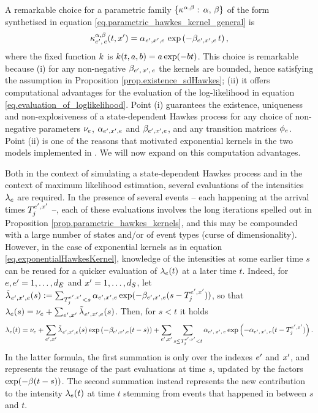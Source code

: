 \documentclass[10pt, article,table]{article}
\begin{document}
A remarkable choice for a parametric family $\lbrace \hawkesKernel^{\impCoef,\decCoef}: \, \impCoef, \, \decCoef\rbrace$ of the form synthetised in equation \eqref{eq.parametric_hawkes_kernel_general} is 
\begin{equation}\label{eq.exponentialHawkesKernel}
 \hawkesKernel^{\alpha,\beta}\subscriptee(t,\xone) = \impCoef_{\eone,\xone,e} \, \exp\left( -\decCoef_{\eone,\xone,e} \, t \right),
\end{equation}
where the fixed function $\parametricHawkesKernel$ is $\parametricHawkesKernel(t,a,b)=a\exp(-bt)$.
This choice is remarkable because (i) for any non-negative $\decCoef\subscriptexe$ the kernels are bounded, hence satisfying the assumption in Proposition \ref{prop.existence_sdHawkes}; (ii) it offers computational advantages for the evaluation of the log-likelihood in equation \eqref{eq.evaluation_of_loglikelihood}. 
Point (i) guarantees the existence, uniqueness and non-explosiveness of a state-dependent Hawkes process for any choice of non-negative parameters $\baseRate_e$, 
$\impCoef_{\eone,\xone, e}$ and $\decCoef_{\eone,\xone, e}$, and any transition matrices $\transProb_e$. Point (ii) is one of the reasons that motivated  exponential kernels in the two models implemented in \citealp{MP18sta}. We will now expand on this computation advantages. 

Both in the context of simulating a state-dependent Hawkes process and in the context of maximum likelihood estimation, several evaluations of the intensities $\intensity$ are required. 
In the presence of several events -- each happening at the arrival times $\arrivalTimes[\eone,\xone]_j$ --, each of these evaluations involves the long iterations spelled out in Proposition \ref{prop.parametric_hawkes_kernels}, and this may be compounded with a large number of states and/or of event types (curse of dimensionality). However, in the case of exponential kernels as in equation \eqref{eq.exponentialHawkesKernel}, knowledge of the intensities at some earlier time $s$ can be reused for a quicker evaluation of $\intensity(t)$ at a later time $t$. Indeed, for $e,\eone=1,\dots,\numEventTypes$ and $\xone=1,\dots,\numStates$, let $\tilde{\intensity[]}_{\eone,\xone,e}(s):= \sum_{\arrivalTimes[\eone,\xone]_j<s}\impCoef_{\eone,\xone,e}\exp(-\decCoef_{\eone,\xone,e}(s-\arrivalTimes[\eone,\xone]_j))$, so that $\intensity[e](s)=\baseRate_e+\sum_{\eone,\xone}\tilde{\intensity[]}_{\eone,\xone,e}(s)$. Then, for $s<t$ it holds
\begin{equation}\label{eq.update_of_exponential_intensity}
 \intensity[e](t) = \baseRate_e + \sum_{\eone,\xone}\tilde{\intensity[]}_{\eone,\xone,e}(s)\exp\left(-\decCoef_{\eone,\xone,e}(t-s)\right)
 + \sum_{\eone,\xone}\sum_{s\leq\arrivalTimes[\eone,\xone]_j<t} \impCoef\subscriptexe \exp\left(-\impCoef\subscriptexe(t-\arrivalTimes[\eone,\xone]_j)\right).
\end{equation}
In the latter formula, the first summation is only over the indexes $\eone$ and $\xone$, and represents the reusage of the past evaluations at time $s$, updated by the factors $\exp(-\decCoef (t-s))$. The second summation instead represents the new contribution to the intensity $\intensity[e](t)$ at time $t$ stemming from events that happened in between $s$ and $t$. 
\end{document}
